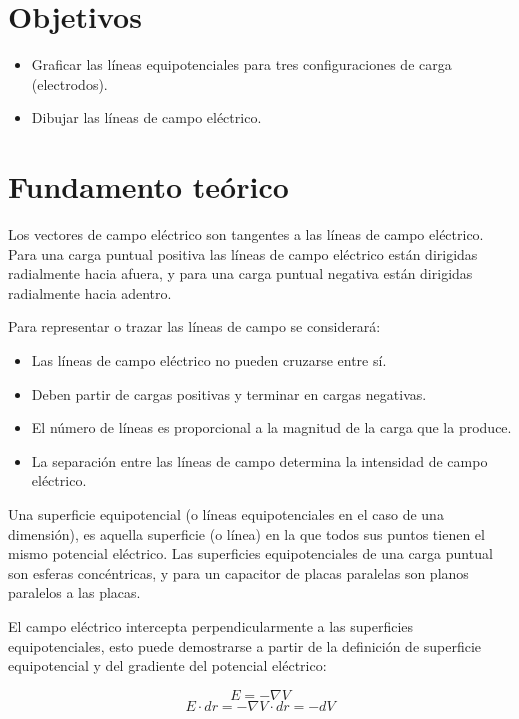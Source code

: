 \documentclass[letter,11pt]{article}
\begin{document}
\section{Objetivos}
\begin{itemize}
\item Graficar las líneas equipotenciales para tres configuraciones de carga
(electrodos).
\item Dibujar las líneas de campo eléctrico.
\end{itemize}

\section{Fundamento teórico}

Los vectores de campo eléctrico son tangentes a las líneas de campo eléctrico.
Para una carga puntual positiva las líneas de campo eléctrico están dirigidas
radialmente hacia afuera, y para una carga puntual negativa están dirigidas
radialmente hacia adentro.

Para representar o trazar las líneas de campo se considerará:

\begin{itemize}
\item Las líneas de campo eléctrico no pueden cruzarse entre sí.
\item Deben partir de cargas positivas y terminar en cargas negativas.
\item El número de líneas es proporcional a la magnitud de la carga que la
produce.
\item La separación entre las líneas de campo determina la intensidad de campo
eléctrico.
\end{itemize}

Una superficie equipotencial (o líneas equipotenciales en el caso de una
dimensión), es aquella superficie (o línea) en la que todos sus puntos tienen el
mismo potencial eléctrico. Las superficies equipotenciales de una carga puntual
son esferas concéntricas, y para un capacitor de placas paralelas son planos
paralelos a las placas.

El campo eléctrico intercepta perpendicularmente a las superficies
equipotenciales, esto puede demostrarse a partir de la definición de superficie
equipotencial y del gradiente del potencial eléctrico:

\begin{equation}
    E = - \nabla V
\end{equation}
\begin{equation}
    E \cdot dr = - \nabla V \cdot dr = - dV
\end{equation}
\end{document}
